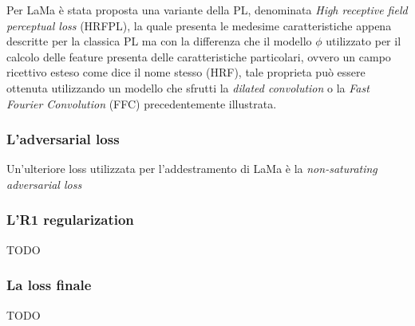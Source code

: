 Per LaMa è stata proposta una variante della PL, denominata \textit{High receptive field perceptual loss} (HRFPL), la quale
presenta le medesime caratteristiche appena descritte per la classica PL ma con la differenza che il modello $\phi$ utilizzato
per il calcolo delle feature presenta delle caratteristiche particolari, ovvero un campo ricettivo esteso come dice il nome stesso (HRF),
tale proprieta può essere ottenuta utilizzando un modello che sfrutti la \textit{dilated convolution} o la \textit{Fast Fourier Convolution} (FFC)
precedentemente illustrata.

\subsubsection{L'adversarial loss}
Un'ulteriore loss utilizzata per l'addestramento di LaMa è la \textit{non-saturating adversarial loss} 

\subsubsection{L'R1 regularization}
TODO

\subsubsection{La loss finale}
TODO

